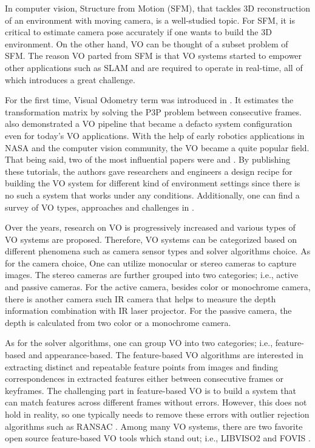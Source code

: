 \documentclass[a4paper]{report}
\numberwithin{figure}{section}
\begin{document}
In computer vision, Structure from Motion (SFM), that tackles 3D 
reconstruction of an environment with moving camera, is a well-studied topic. 
For SFM, it is critical to estimate camera pose accurately if one wants to 
build the 3D 
environment. On the other hand, VO can be thought of a subset problem of SFM. 
The reason VO 
parted 
from SFM is that VO systems started to empower other applications such as SLAM 
and are required to operate in real-time, all of which introduces a great 
challenge.

For the first time, Visual Odometry term was introduced in 
\parencite{Nister2004}. 
It estimates the transformation matrix by solving the P3P problem between 
consecutive frames. \cite{Nister2004} also demonstrated a VO pipeline that 
became a 
defacto system configuration even for today's VO applications. With the help 
of early robotics applications in NASA and the computer vision community, the 
VO 
became a quite popular field. That being said, two of the most influential 
papers were \parencite{Fraundorfer2012} and \parencite{Scaramuzza2011}. By 
publishing 
these tutorials, the authors gave researchers and engineers a 
design recipe 
for building the VO system for different kind of environment settings since 
there is no such a system that works under any conditions. Additionally, one 
can find a 
survey of VO types, approaches and challenges in \parencite{Aqel2016}.

Over the years, research on VO is progressively increased and various types of 
VO systems are proposed. Therefore, VO systems can be categorized based on 
different phenomena such as camera sensor types and solver algorithms choice. 
As for the camera choice, One can utilize monocular or stereo cameras to 
capture images. The stereo 
cameras are further grouped into two categories; i.e., active and passive 
cameras. For the active camera, besides color or monochrome camera, there is 
another camera such IR camera that helps to measure the depth information 
combination 
with IR laser projector. For the passive camera, the depth is calculated from 
two color or a monochrome camera. 

As for the solver algorithms, one can 
group VO into two categories; i.e., feature-based and appearance-based.
The feature-based VO algorithms are interested in extracting distinct and 
repeatable feature points from images and finding correspondences in extracted 
features either between consecutive frames or keyframes. The challenging part 
in feature-based VO is to build a system that can match features across 
different frames without errors. However, this does not hold in reality, so 
one typically needs to remove these errors with outlier rejection algorithms 
such as RANSAC \parencite{Fischler1981b}. Among many VO systems, there are two 
favorite open source feature-based VO tools which stand out; i.e., LIBVISO2 
\parencite{Geiger2011} and FOVIS \parencite{Huanga2011}. 
\end{document}
